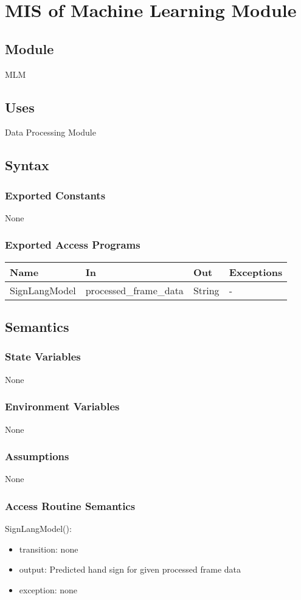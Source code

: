 \documentclass[12pt, titlepage]{article}
\begin{document}
\section{MIS of Machine Learning Module} \label{Module} 
\subsection{Module}
MLM
\subsection{Uses}
Data Processing Module
\subsection{Syntax}
\subsubsection{Exported Constants}
None
\subsubsection{Exported Access Programs}
\begin{center}
\begin{tabular}{p{4cm} p{5cm} p{2cm} p{2cm}}
\hline
\textbf{Name} & \textbf{In} & \textbf{Out} & \textbf{Exceptions} \\
\hline
SignLangModel & processed\_frame\_data & String & - \\
\hline
\end{tabular}
\end{center}
\subsection{Semantics}
\subsubsection{State Variables}
None
\subsubsection{Environment Variables}
None
\subsubsection{Assumptions}
None
\subsubsection{Access Routine Semantics}
SignLangModel():
\begin{itemize}
    \item transition: none
    \item output: Predicted hand sign for given processed frame data
    \item exception: none
\end{itemize}
\end{document}
